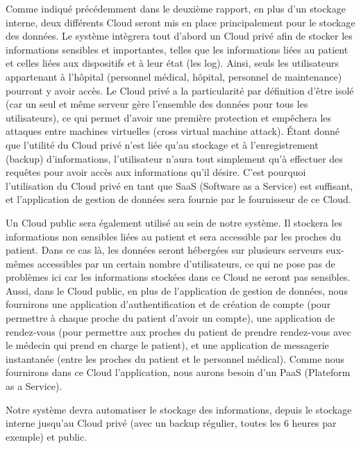 Comme indiqué précédemment dans le deuxième rapport, en plus d'un stockage interne, deux différents Cloud \cite{cloud} seront mis en place principalement pour le stockage des données. Le système intègrera tout d'abord un Cloud privé afin de stocker les informations sensibles et importantes, telles que les informations liées au patient et celles liées aux dispositifs et à leur état (les log). Ainsi, seuls les utilisateurs appartenant à l’hôpital (personnel médical, hôpital, personnel de maintenance) pourront y avoir accès. Le Cloud privé a la particularité par définition d'être isolé (car un seul et même serveur gère l’ensemble des données pour tous les utilisateurs), ce qui permet d'avoir une première protection et empêchera les attaques entre machines virtuelles (cross virtual machine attack). Étant donné que l'utilité du Cloud privé n'est liée qu'au stockage et à l'enregistrement (backup) d'informations, l'utilisateur n'aura tout simplement qu'à effectuer des requêtes pour avoir accès aux informations qu'il désire. C'est pourquoi l'utilisation du Cloud privé en tant que SaaS (Software as a Service) est suffisant, et l'application de gestion de données sera fournie par le fournisseur de ce Cloud.

Un Cloud public sera également utilisé au sein de notre système. Il stockera les informations non sensibles liées au patient et sera accessible par les proches du patient. Dans ce cas là, les données seront hébergées sur plusieurs serveurs eux-mêmes accessibles par un certain nombre d’utilisateurs, ce qui ne pose pas de problèmes ici car les informations stockées dans ce Cloud ne seront pas sensibles. Aussi, dans le Cloud public, en plus de l'application de gestion de données, nous fournirons une application d'authentification et de création de compte (pour permettre à chaque proche du patient d'avoir un compte), une application de rendez-vous (pour permettre aux proches du patient de prendre rendez-vous avec le médecin qui prend en charge le patient), et une application de messagerie instantanée (entre les proches du patient et le personnel médical). Comme nous fournirons dans ce Cloud l'application, nous aurons besoin d'un PaaS (Plateform as a Service).

Notre système devra automatiser le stockage des informations, depuis le stockage interne jusqu'au Cloud privé (avec un backup régulier, toutes les 6 heures par exemple) et public.

